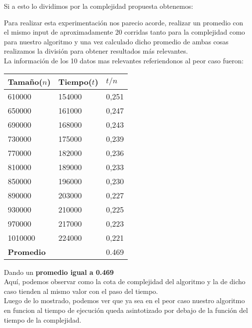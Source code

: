 Si a esto lo dividimos por la complejidad propuesta obtenemos:\\

\vspace*{0.3cm} \vspace*{0.3cm}
  \begin{center}
  \end{center}
  \vspace*{0.3cm}
  
  Para realizar esta experimentaci\'on nos parecio acorde, realizar un promedio con el mismo input de aproximadamente 20 corridas tanto para la complejidad como para nuestro algoritmo y una vez calculado dicho promedio de ambas cosas realizamos la divisi\'on para
obtener resultados m\'as relevantes.\\ 


La informaci\'on de los 10 datos mas relevantes referiendonos al peor caso fueron:

\begin{table}[H]

    \begin{tabular}{ | l | l |l |}
    \hline
	Tamaño($n$) & Tiempo($t$) & \textbf{$t /n$}  \\ \hline
610000 & 154000 & 0,251 \\ \hline
650000 & 161000 & 0,247 \\ \hline
690000 & 168000 & 0,243 \\ \hline
730000 & 175000 & 0,239 \\ \hline
770000 & 182000 & 0,236 \\ \hline
810000 & 189000 & 0,233 \\ \hline
850000 & 196000 & 0,230 \\ \hline
890000 & 203000 & 0,227 \\ \hline
930000 & 210000 & 0,225 \\ \hline
970000 & 217000 & 0,223 \\ \hline
1010000 & 224000 & 0,221 \\ \hline
    \textbf{Promedio} & & 0.469 \\ \hline

    \end{tabular}
\end{table}

Dando un \textbf{promedio igual a 0.469} \\

Aqu\'i, podemos observar como la cota de complejidad del algoritmo y la de dicho caso tienden al mismo valor con el paso del tiempo.\\

Luego de lo mostrado, podemos ver que ya sea en el peor caso nuestro algoritmo en funcion al tiempo de ejecuci\'on queda asintotizado por debajo de la funci\'on del tiempo de la complejidad.